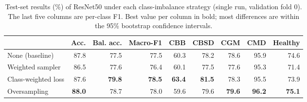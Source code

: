 \begin{table}[t]
\centering
\caption{Test-set results (\%) of ResNet50 under each class-imbalance strategy (single run, validation fold 0). The last five columns are per-class F1. Best value per column in bold; most differences are within the 95\% bootstrap confidence intervals.}
\label{tab:imbalance-results}
\begin{tabular}{lrrrrrrrr}
\toprule
 & Acc. & Bal. acc. & Macro-F1 & CBB & CBSD & CGM & CMD & Healthy \\
\midrule
None (baseline) & 87.8 & 77.5 & 77.5 & 60.3 & 78.2 & 78.6 & 95.9 & 74.6 \\
Weighted sampler & 86.5 & 77.6 & 76.4 & 60.1 & 77.5 & 77.6 & 95.3 & 71.4 \\
Class-weighted loss & 87.6 & \textbf{79.8} & \textbf{78.5} & \textbf{63.4} & \textbf{81.5} & 78.3 & 95.5 & 73.9 \\
Oversampling & \textbf{88.0} & 78.7 & 78.0 & 59.6 & 79.6 & \textbf{79.6} & \textbf{96.2} & \textbf{75.1} \\
\bottomrule
\end{tabular}
\end{table}
